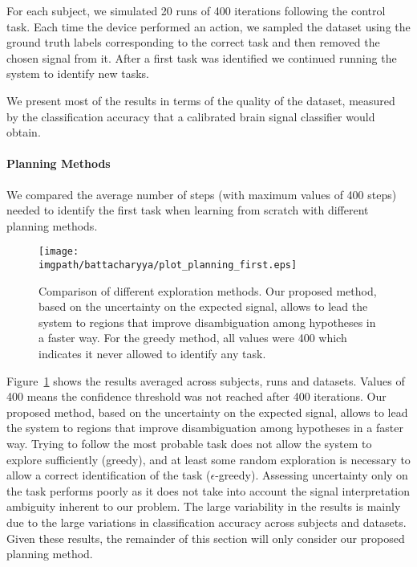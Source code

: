 For each subject, we simulated 20 runs of 400 iterations following the control task. Each time the device performed an action, we sampled the dataset using the ground truth labels corresponding to the correct task and then removed the chosen signal from it. After a first task was identified we continued running the system to identify new tasks. 

We present most of the results in terms of the quality of the dataset, measured by the classification accuracy that a calibrated brain signal classifier would obtain.

\paragraph{Planning Methods}

We compared the average number of steps (with maximum values of 400 steps) needed to identify the first task when learning from scratch with different planning methods.

\begin{figure}[!htbp]
    \centering
    \texttt{[image: \\imgpath/battacharyya/plot\_planning\_first.eps]}
    \caption{Comparison of different exploration methods. Our proposed method, based on the uncertainty on the expected signal, allows to lead the system to regions that improve disambiguation among hypotheses in a faster way. For the greedy method, all values were 400 which indicates it never allowed to identify any task.}
    \label{fig:overlapcompplan}
\end{figure}

Figure~\ref{fig:overlapcompplan} shows the results averaged across subjects, runs and datasets. Values of 400 means the confidence threshold was not reached after 400 iterations. Our proposed method, based on the uncertainty on the expected signal, allows to lead the system to regions that improve disambiguation among hypotheses in a faster way. Trying to follow the most probable task does not allow the system to explore sufficiently (greedy), and at least some random exploration is necessary to allow a correct identification of the task ($\epsilon$-greedy). Assessing uncertainty only on the task performs poorly as it does not take into account the signal interpretation ambiguity inherent to our problem. The large variability in the results is mainly due to the large variations in classification accuracy across subjects and datasets. Given these results, the remainder of this section will only consider our proposed planning method.

